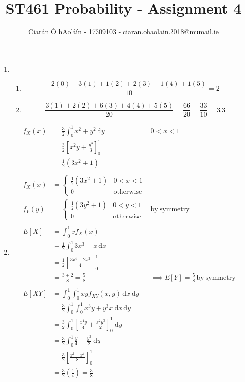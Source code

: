 \documentclass{article}
\title{ST461 Probability - Assignment 4}
\author{Ciarán Ó hAoláín - 17309103 - ciaran.ohaolain.2018@mumail.ie}
\makeatletter
\theoremstyle{definition}
\theoremstyle{remark}
\theoremstyle{example}
\newcommand{\otherwise}{\mathrm{otherwise}}
\renewcommand{\d}{\ \mathrm{d}}
\newcommand{\skipitems}[1]{%
	\addtocounter{\@enumctr}{#1}%
}
\makeatother
\begin{document}
	\maketitle
	\begin{enumerate}
		\item
		\begin{enumerate}
			\item \[\frac{2(0)+3(1)+1(2)+2(3)+1(4)+1(5)}{10}=2\]
			\item \[ \frac{3(1)+2(2)+6(3)+4(4)+5(5)}{20} = \frac{66}{20}=\frac{33}{10} = 3.3\]
		\end{enumerate}
	\skipitems{1}
		\item \begin{align*}
			f_X(x)&=\frac{3}{2} \int_{0}^{1}x^2+y^2\d y & 0 < x < 1\\
			& = \frac32\left[x^2y+\frac{y^3}{3}\right]^1_0\\
			& = \frac12\left(3x^2+1\right)\\
			\\
			f_X(x)&=\begin{cases}
				\frac12\left(3x^2+1\right) & 0 < x < 1\\
				0 & \otherwise
			\end{cases}\\
			f_Y(y)&=\begin{cases}
			\frac12\left(3y^2+1\right) & 0 < y < 1\\
			0 & \otherwise
			\end{cases} & \mathrm{by\ symmetry}\\
			\\
			E[X]&=\int_{0}^{1}x f_X(x)\\
			& = \frac12 \int_{0}^{1}3x^3+x \d x\\
			&= \frac12 \left[\frac{3x^4+2x^2}{4}\right]_0^1\\
			&=\frac{3+2}{8} = \frac58  & \implies E[Y]=\frac58\ \mathrm{by\ symmetry}\\
			\\
			E[XY]&=\int_{0}^{1}\int_{0}^{1}xyf_{XY}(x,y)\d x \d y\\
			& = \frac32 \int_{0}^{1} \int_{0}^{1} x^3y+y^3x \d x \d y\\
			&= \frac32 \int_{0}^{1} \left[\frac{x^4y}{4}+\frac{x^2y^3}{2}\right]_0^1 \d y\\
			&= \frac32 \int_{0}^{1} \frac{y}4 + \frac{y^3}{2} \d y \\
			&= \frac32 \left[\frac{y^2+y^4}{8}\right]_0^1\\
			&= \frac32 \left(\frac14\right) = \frac38\\

\end{align*}
\end{enumerate}
\end{document}
